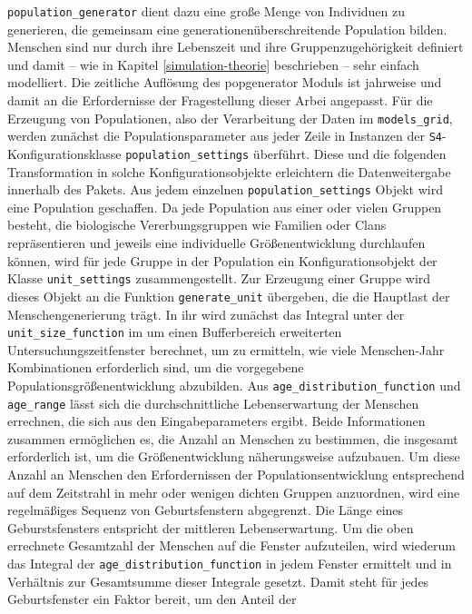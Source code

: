 \documentclass[openany,twoside,twocolumn]{book}
\begin{document}
\texttt{population\_generator} dient dazu eine große Menge von
Individuen zu generieren, die gemeinsam eine generationenüberschreitende
Population bilden. Menschen sind nur durch ihre Lebenszeit und ihre
Gruppenzugehörigkeit definiert und damit -- wie in Kapitel
\ref{simulation-theorie} beschrieben -- sehr einfach modelliert. Die
zeitliche Auflösung des popgenerator Moduls ist jahrweise und damit an
die Erfordernisse der Fragestellung dieser Arbei angepasst. Für die
Erzeugung von Populationen, also der Verarbeitung der Daten im
\texttt{models\_grid}, werden zunächst die Populationsparameter aus
jeder Zeile in Instanzen der \texttt{S4}-Konfigurationsklasse
\texttt{population\_settings} überführt. Diese und die folgenden
Transformation in solche Konfigurationsobjekte erleichtern die
Datenweitergabe innerhalb des Pakets. Aus jedem einzelnen
\texttt{population\_settings} Objekt wird eine Population geschaffen. Da
jede Population aus einer oder vielen Gruppen besteht, die biologische
Vererbungsgruppen wie Familien oder Clans repräsentieren und jeweils
eine individuelle Größenentwicklung durchlaufen können, wird für jede
Gruppe in der Population ein Konfigurationsobjekt der Klasse
\texttt{unit\_settings} zusammengestellt. Zur Erzeugung einer Gruppe
wird dieses Objekt an die Funktion \texttt{generate\_unit} übergeben,
die die Hauptlast der Menschengenerierung trägt. In ihr wird zunächst
das Integral unter der \texttt{unit\_size\_function} im um einen
Bufferbereich erweiterten Untersuchungszeitfenster berechnet, um zu
ermitteln, wie viele Menschen-Jahr Kombinationen erforderlich sind, um
die vorgegebene Populationsgrößenentwicklung abzubilden. Aus
\texttt{age\_distribution\_function} und \texttt{age\_range} lässt sich
die durchschnittliche Lebenserwartung der Menschen errechnen, die sich
aus den Eingabeparameters ergibt. Beide Informationen zusammen
ermöglichen es, die Anzahl an Menschen zu bestimmen, die insgesamt
erforderlich ist, um die Größenentwicklung näherungsweise aufzubauen. Um
diese Anzahl an Menschen den Erfordernissen der Populationsentwicklung
entsprechend auf dem Zeitstrahl in mehr oder wenigen dichten Gruppen
anzuordnen, wird eine regelmäßiges Sequenz von Geburtsfenstern
abgegrenzt. Die Länge eines Geburstsfensters entspricht der mittleren
Lebenserwartung. Um die oben errechnete Gesamtzahl der Menschen auf die
Fenster aufzuteilen, wird wiederum das Integral der
\texttt{age\_distribution\_function} in jedem Fenster ermittelt und in
Verhältnis zur Gesamtsumme dieser Integrale gesetzt. Damit steht für
jedes Geburtsfenster ein Faktor bereit, um den Anteil der
\end{document}
